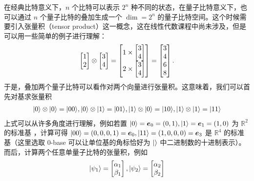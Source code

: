 \documentclass[a4paper,11pt,onecolumn,twoside]{article}
\begin{document}
在经典比特意义下，$n$ 个比特可以表示 $2^n$ 种不同的状态，在量子比特意义下，也可以通过 $n$ 个量子比特的叠加生成一个 $\dim=2^n$ 的量子比特空间。这个时候需要引入张量积（tensor product）这一概念，这在线性代数课程中尚未涉及，但是可以用一些简单的例子进行理解： \begin{align*}
    \begin{bmatrix}
        1 \\2
    \end{bmatrix}
    \otimes
    \begin{bmatrix}
        3 \\4
    \end{bmatrix}
    =
    \begin{bmatrix}
        1\times \begin{bmatrix}
                    3 \\4
                \end{bmatrix} \\
        2\times \begin{bmatrix}
                    3 \\4
                \end{bmatrix}
    \end{bmatrix}
    =
    \begin{bmatrix}
        3 \\4 \\6 \\8
    \end{bmatrix}.
\end{align*}
于是，叠加两个量子比特可以看作对两个向量进行张量积。这意味着，我们可以首先对基求张量积 \begin{align*}
    |0\rangle\otimes|0\rangle=|00\rangle,|0\rangle\otimes|1\rangle=|01\rangle,|1\rangle\otimes|0\rangle=|10\rangle,|1\rangle\otimes|1\rangle=|11\rangle
\end{align*}
上式可以从许多角度进行理解，例如若置 $|0\rangle=\bm{e}_0=(0,1),|1\rangle=\bm{e}_1=(1,0)$ 为 $\mathbb{R}^2$ 的标准基 ，计算可得 $|00\rangle=(0,0,0,1)=\bm{e}_0,|11\rangle=(1,0,0,0)=\bm{e}_3$ 是 $\mathbb{R}^4$ 的标准基（这里选取 0-base 可以让单位基的角标恰好为 $|\rangle$ 中二进制数的十进制表示）。而后，计算两个任意单量子比特的张量积，例如
\begin{align}
    |\psi_1\rangle=\begin{bmatrix}
                     \alpha_1 \\\beta_1
                 \end{bmatrix},
    |\psi_2\rangle=\begin{bmatrix}
                     \alpha_2 \\\beta_2
                 \end{bmatrix}
\end{align}
\end{document}

